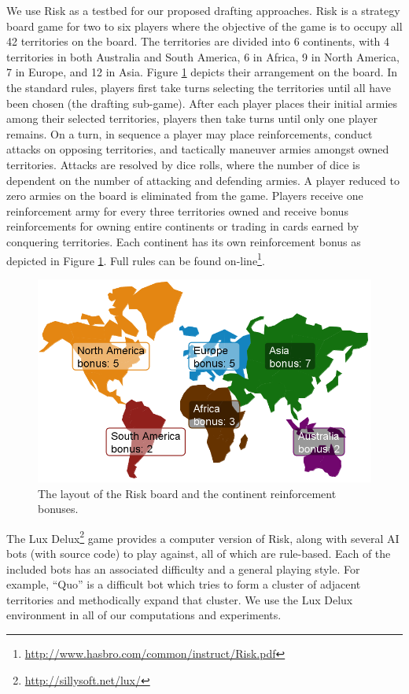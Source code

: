 \documentclass[letterpaper]{article}
\numberwithin{equation}{section}
\numberwithin{theorem}{section}
\numberwithin{lemma}{section}
\numberwithin{df}{section}
\begin{document}
We use Risk as a testbed for our proposed drafting approaches.  Risk is a strategy board game for two to six players where the objective of the game is to occupy all 42 territories on the board.  The territories are divided into 6 continents, with 4 territories in both Australia and South America, 6 in Africa, 9 in North America, 7 in Europe, and 12 in Asia.  Figure \ref{fig:Conts} depicts their arrangement on the board.  In the standard rules, players first take turns selecting the territories until all have been chosen (the drafting sub-game).  After each player places their initial armies among their selected territories, players then take turns until only one player remains.  On a turn, in sequence a player may place reinforcements, conduct attacks on opposing territories, and tactically maneuver armies amongst owned territories.  Attacks are resolved by dice rolls, where the number of dice is dependent on the number of attacking and defending armies.  A player reduced to zero armies on the board is eliminated from the game.  Players receive one reinforcement army for every three territories owned and receive bonus reinforcements for owning entire continents or trading in cards earned by conquering territories.  Each continent has its own reinforcement bonus as depicted in Figure \ref{fig:Conts}.  Full rules can be found on-line\footnote{\url{http://www.hasbro.com/common/instruct/Risk.pdf}}.

\begin{figure}[t]
	\centering
	\includegraphics[scale=0.325]{figs/Conts.png}
	\caption{The layout of the Risk board and the continent reinforcement bonuses.}
	\label{fig:Conts}
\end{figure}

The Lux Delux\footnote{\url{http://sillysoft.net/lux/}} game provides a computer version of Risk, along with several AI bots (with source code) to play against, all of which are rule-based.  Each of the included bots has an associated difficulty and a general playing style.  For example, ``Quo'' is a difficult bot which tries to form a cluster of adjacent territories and methodically expand that cluster.  We use the Lux Delux environment in all of our computations and experiments.
\end{document}
